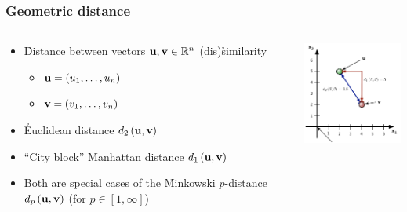 \documentclass[t]{beamer} %
\begin{document}
\begin{frame}
  \frametitle{Geometric distance}

  \begin{columns}[T]
    \begin{column}{60mm}
      \begin{itemize}
      \item \h{Distance} between vectors $\vu, \vv \in \setR^n$ \so
        (dis)\h{similarity}
        \begin{itemize}
        \item $\vu = (u_1, \ldots, u_n)$
        \item $\vv = (v_1, \ldots, v_n)$
        \end{itemize}
      \item<2-> \h{Euclidean} distance $\dist[2]{\vu}{\vv}$
      \item<3-> ``City block'' \h{Manhattan} distance $\dist[1]{\vu}{\vv}$
      \item<4-> Both are special cases of the \h{Minkowski} $p$-distance
        $\dist[p]{\vu}{\vv}$ (for $p\in [1, \infty]$)
      \end{itemize}
    \end{column}
    \begin{column}{45mm}
      \includegraphics[width=45mm]{img/2_distance_examples}
    \end{column}
  \end{columns}
  \gap[.5]
\end{frame}
\end{document}
